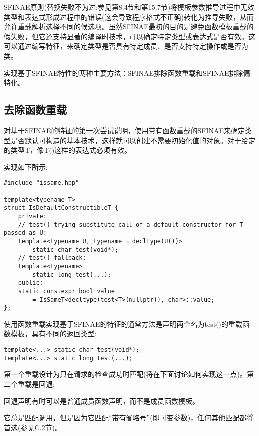 
SFINAE原则(替换失败不为过;参见第8.4节和第15.7节)将模板参数推导过程中无效类型和表达式形成过程中的错误(这会导致程序格式不正确)转化为推导失败，从而允许重载解析选择不同的候选项。虽然SFINAE最初的目的是避免函数模板重载的假失败，但它还支持显著的编译时技术，可以确定特定类型或表达式是否有效。这可以通过编写特征，来确定类型是否具有特定成员、是否支持特定操作或是否为类。

实现基于SFINAE特性的两种主要方法：SFINAE排除函数重载和SFINAE排除偏特化。

\subsection{去除函数重载}

对基于SFINAE的特征的第一次尝试说明，使用带有函数重载的SFINAE来确定类型是否默认可构造的基本技术，这样就可以创建不需要初始化值的对象。对于给定的类型T，像T()这样的表达式必须有效。

实现如下所示:

\begin{lstlisting}[style=styleCXX]
#include "issame.hpp"

template<typename T>
struct IsDefaultConstructibleT {
	private:
	// test() trying substitute call of a default constructor for T passed as U:
	template<typename U, typename = decltype(U())>
		static char test(void*);
	// test() fallback:
	template<typename>
		static long test(...);
	public:
	static constexpr bool value
		= IsSameT<decltype(test<T>(nullptr)), char>::value;
};
\end{lstlisting}

使用函数重载实现基于SFINAE的特征的通常方法是声明两个名为test()的重载函数模板，具有不同的返回类型:

\begin{lstlisting}[style=styleCXX]
template<...> static char test(void*);
template<...> static long test(...);
\end{lstlisting}

第一个重载设计为只在请求的检查成功时匹配(将在下面讨论如何实现这一点)。第二个重载是回退:

\begin{tcolorbox}[colback=webgreen!5!white,colframe=webgreen!75!black]
\hspace*{0.75cm}回退声明有时可以是普通成员函数声明，而不是成员函数模板。
\end{tcolorbox}

它总是匹配调用，但是因为它匹配“带有省略号”(即可变参数)，任何其他匹配都将首选(参见C.2节)。

